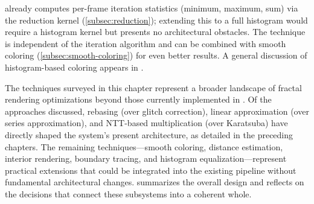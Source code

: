 \FractalShark{} already computes per-frame iteration statistics
(minimum, maximum, sum) via the reduction kernel
(\cref{subsec:reduction}); extending this to a full histogram would
require a histogram kernel but presents no architectural obstacles.  The
technique is independent of the iteration algorithm and can be combined
with smooth coloring (\cref{subsec:smooth-coloring}) for even better
results.  A general discussion of histogram-based coloring appears in
\cite{WikipediaPlottingAlgorithms}.

The techniques surveyed in this chapter represent a broader landscape of
fractal rendering optimizations beyond those currently implemented in
\FractalShark{}.  Of the approaches discussed, rebasing (over glitch
correction), linear approximation (over series approximation), and
NTT-based multiplication (over Karatsuba) have directly shaped the
system's present architecture, as detailed in the preceding chapters.
The remaining techniques---smooth coloring, distance estimation,
interior rendering, boundary tracing, and histogram
equalization---represent practical extensions that could be integrated
into the existing pipeline without fundamental architectural changes.
 summarizes the overall design and reflects on the
decisions that connect these subsystems into a coherent whole.
